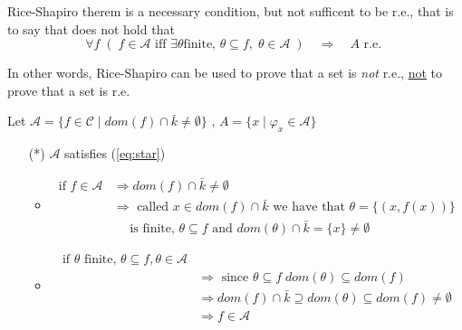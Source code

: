 \begin{observation}
  Rice-Shapiro therem is a necessary condition, but not sufficent to
  be r.e., that is to say that does not hold that
  \begin{equation}\label{eq:star}
    \forall f \; (\; f \in \mathcal{A} \mbox{ iff } \exists \theta \mbox{
      finite, } \theta \subseteq f, \; \theta \in \mathcal{A} \; ) \quad
    \Rightarrow \quad A \mbox{ r.e. } 
  \end{equation}

  In other words, Rice-Shapiro can be used to prove that a set is
  \emph{not} r.e., \underline{not} to prove that a set is r.e.
\end{observation}

\begin{counterexample}
  Let
  $\mathcal{A} = \{ f \in \mathcal{C} \mid dom(f) \cap \bar{k} \neq
  \emptyset\}$ , $A = \{x \mid \varphi_x \in \mathcal{A}\}$

  \begin{enumerate}
  \item[(*)] $\mathcal{A}$ satisfies (\ref{eq:star})
    \begin{itemize}
    \item \[
        \begin{aligned}
          \mbox{if } f \in \mathcal{A} & \Rightarrow dom(f) \cap \bar{k} \neq \emptyset \\
                                       & \Rightarrow \mbox{ called } x \in dom(f) \cap \bar{k} \mbox{ we have that } \theta = \{(x, f(x))\} \\
                                       & \quad \mbox{ is finite, } \theta \subseteq f \mbox{ and } dom(\theta)\cap \bar{k} = \{x\} \neq \emptyset
        \end{aligned}
      \]

    \item \[
        \begin{aligned}
          \mbox{if $\theta$ finite, } \theta \subseteq f, \theta \in \mathcal{A} & \\
          & \Rightarrow \mbox{ since } \theta \subseteq f \; dom(\theta) \subseteq dom(f) \\
          & \Rightarrow dom(f) \cap \bar{k} \supseteq dom(\theta) \subseteq dom(f) \neq \emptyset \\
          & \Rightarrow f \in \mathcal{A}
        \end{aligned}
      \]
    \end{itemize}


\end{enumerate}
\end{counterexample}
